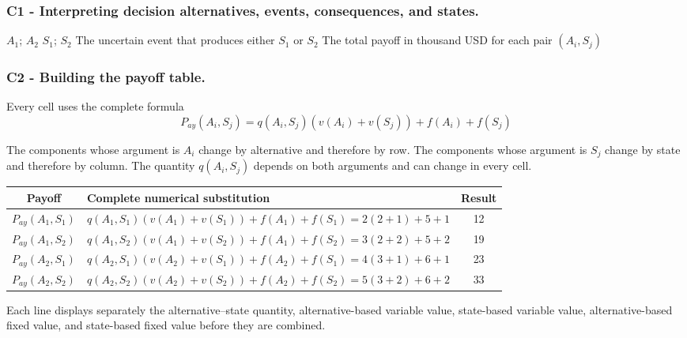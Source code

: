 	\subsubsection*{C1 - Interpreting decision alternatives, events, consequences, and states.}
	\label{subsec:problem2-advanced-general-problem-c1}
	
	\DecisionElementsTable
	{$A_1$; $A_2$}
	{$S_1$; $S_2$}
	{The uncertain event that produces either $S_1$ or $S_2$}
	{The total payoff in thousand USD for each pair $(A_i,S_j)$}
	
	
	\subsubsection*{C2 - Building the payoff table.}
	\label{subsec:problem2-advanced-general-problem-c2}
	
	Every cell uses the complete formula
	\[
	P_{ay}(A_i,S_j)
	=
	q(A_i,S_j)\left(v(A_i)+v(S_j)\right)+f(A_i)+f(S_j)
	\]
	
	The components whose argument is $A_i$ change by alternative and therefore by row. The components whose argument is $S_j$ change by state and therefore by column. The quantity $q(A_i,S_j)$ depends on both arguments and can change in every cell.
	
	\begin{center}
		\small
		\begin{tabular}{clc}
			\toprule
			Payoff & Complete numerical substitution & Result \\
			\midrule
			$P_{ay}(A_1,S_1)$ & $q(A_1,S_1)(v(A_1)+v(S_1))+f(A_1)+f(S_1)=2(2+1)+5+1$ & 12 \\
			$P_{ay}(A_1,S_2)$ & $q(A_1,S_2)(v(A_1)+v(S_2))+f(A_1)+f(S_2)=3(2+2)+5+2$ & 19 \\
			$P_{ay}(A_2,S_1)$ & $q(A_2,S_1)(v(A_2)+v(S_1))+f(A_2)+f(S_1)=4(3+1)+6+1$ & 23 \\
			$P_{ay}(A_2,S_2)$ & $q(A_2,S_2)(v(A_2)+v(S_2))+f(A_2)+f(S_2)=5(3+2)+6+2$ & 33 \\
			\bottomrule
		\end{tabular}
	\end{center}
	
	Each line displays separately the alternative--state quantity, alternative-based variable value, state-based variable value, alternative-based fixed value, and state-based fixed value before they are combined.
	
